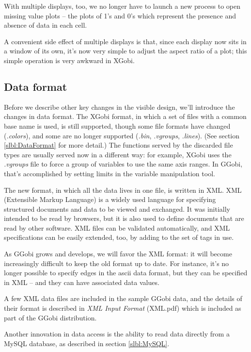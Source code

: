 \documentclass[11pt]{article}
\begin{document}
With multiple displays, too, we no longer have to launch a new
process to open missing value plots -- the plots of 1's and 0's
which represent the presence and absence of data in each cell.

A convenient side effect of multiple displays is that, since each
display now sits in a window of its own, it's now very simple to
adjust the aspect ratio of a plot; this simple operation is very
awkward in XGobi.

\subsection {Data format}

Before we describe other key changes in the visible design, we'll
introduce the changes in data format.  The XGobi format, in which a
set of files with a common base name is used, is still supported,
though some file formats have changed ({\em .colors}), and some are no
longer supported ({\em .bin}, {\em .vgroups}, {\em .lines}).  (See
section \ref{slbl:DataFormat} for more detail.) The functions served
by the discarded file types are usually served now in a different
way:  for example, XGobi uses the {\em .vgroups} file to force
a group of variables to use the same axis ranges.  In GGobi, that's
accomplished by setting limits in the variable manipulation tool.

The new format, in which all the data lives in one file, is written
in XML.  XML (Extensible Markup Language) is a widely used language
for specifying structured documents and data to be viewed and
exchanged.  It was initially intended to be read by browsers, but it
is also used to define documents that are read by other software.
XML files can be validated automatically, and XML specifications can
be easily extended, too, by adding to the set of tags in use.

As GGobi grows and develops, we will favor the XML format:  it
will become increasingly difficult to keep the old format up to
date.  For instance, it's no longer possible to specify edges
in the ascii data format, but they can be specified in XML -- and
they can have associated data values.

A few XML data files are included in the sample GGobi data, and
the details of their format is described in {\em XML Input Format}
(XML.pdf) which is included as part of the GGobi distribution.

Another innovation in data access is the ability to read data
directly from a MySQL database, as described in section \ref{slbl:MySQL}.
\end{document}
